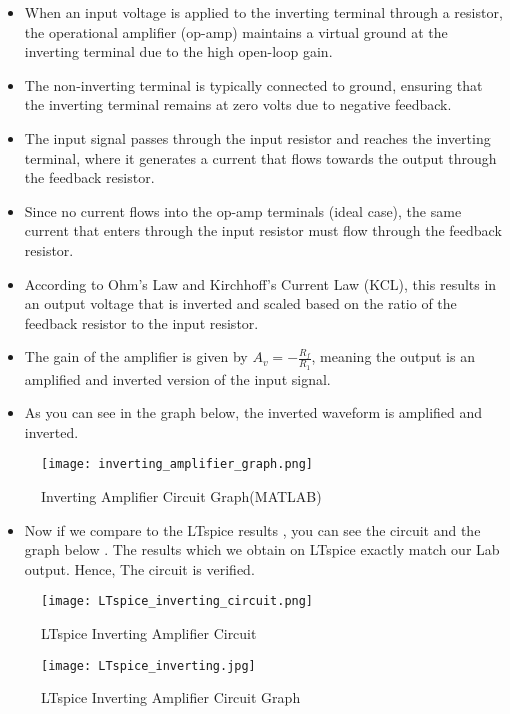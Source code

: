 \documentclass[9pt,conference]{IEEEtran}
\begin{document}
\begin{itemize}
    \item When an input voltage is applied to the inverting terminal through a resistor, the operational amplifier (op-amp) maintains a virtual ground at the inverting terminal due to the high open-loop gain.
    \item The non-inverting terminal is typically connected to ground, ensuring that the inverting terminal remains at zero volts due to negative feedback.
    \item The input signal passes through the input resistor and reaches the inverting terminal, where it generates a current that flows towards the output through the feedback resistor.
    \item Since no current flows into the op-amp terminals (ideal case), the same current that enters through the input resistor must flow through the feedback resistor.
    \item According to Ohm's Law and Kirchhoff's Current Law (KCL), this results in an output voltage that is inverted and scaled based on the ratio of the feedback resistor to the input resistor.
    \item The gain of the amplifier is given by \( A_v = -\frac{R_f}{R_{1}} \), meaning the output is an amplified and inverted version of the input signal.
    \item As you can see in the graph below, the inverted waveform is amplified and inverted.
\end{itemize}

\begin{figure}[H]
    \centering
    \texttt{[image: inverting\_amplifier\_graph.png]}
    \caption{Inverting Amplifier Circuit Graph(MATLAB)}
    \label{fig:positive_clamper}
\end{figure}

\begin{itemize}
    \item Now if we compare to the LTspice results , you can see the circuit and the graph below . The results which we obtain on LTspice exactly match our Lab output. Hence, The circuit is verified.
\end{itemize}
\begin{figure}[H]
    \centering
    \texttt{[image: LTspice\_inverting\_circuit.png]}
    \caption{LTspice Inverting Amplifier Circuit}
    \label{fig:positive_clamper}
\end{figure}
\begin{figure}[H]
    \centering
    \texttt{[image: LTspice\_inverting.jpg]}
    \caption{LTspice Inverting Amplifier Circuit Graph}
    \label{fig:positive_clamper}
\end{figure}
\end{document}
